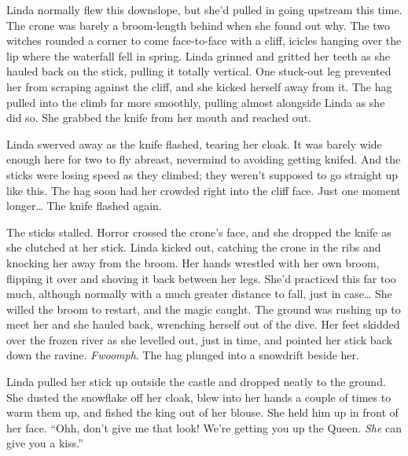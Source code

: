 Linda normally flew this downslope, but she'd pulled in going upstream this time.
The crone was barely a broom-length behind when she found out why.
The two witches rounded a corner to come face-to-face with a cliff, icicles hanging over the lip where the waterfall fell in spring.
Linda grinned and gritted her teeth as she hauled back on the stick, pulling it totally vertical.
One stuck-out leg prevented her from scraping against the cliff, and she kicked herself away from it.
The hag pulled into the climb far more smoothly, pulling almost alongside Linda as she did so.
She grabbed the knife from her mouth and reached out.

Linda swerved away as the knife flashed, tearing her cloak.
It was barely wide enough here for two to fly abreast, nevermind to avoiding getting knifed.
And the sticks were losing speed as they climbed; they weren't supposed to go straight up like this.
The hag soon had her crowded right into the cliff face.
Just one moment longer\dots
The knife flashed again.

The sticks stalled.
Horror crossed the crone's face, and she dropped the knife as she clutched at her stick.
Linda kicked out, catching the crone in the ribs and knocking her away from the broom.
Her hands wrestled with her own broom, flipping it over and shoving it back between her legs.
She'd practiced this far too much, although normally with a much greater distance to fall, just in case\dots
She willed the broom to restart, and the magic caught.
The ground was rushing up to meet her and she hauled back, wrenching herself out of the dive.
Her feet skidded over the frozen river as she levelled out, just in time, and pointed her stick back down the ravine.
\emph{Fwoomph}.
The hag plunged into a snowdrift beside her.

\storybreak

Linda pulled her stick up outside the castle and dropped neatly to the ground.
She dusted the snowflake off her cloak, blew into her hands a couple of times to warm them up, and fished the king out of her blouse.
She held him up in front of her face.
``Ohh, don't give me that look!
We're getting you up the Queen.
\emph{She} can give you a kiss.''
